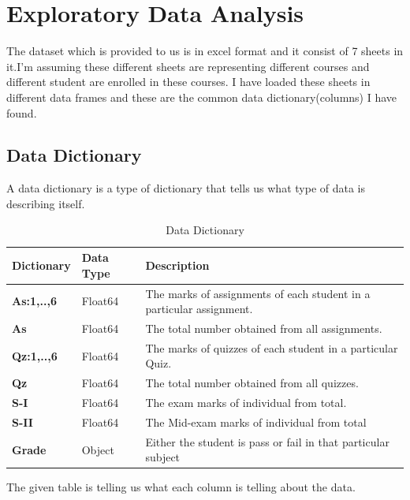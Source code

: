 \documentclass[12pt,a4paper]{article}
\begin{document}
	
 
 \clearpage
\tableofcontents
\clearpage
\section{Exploratory Data Analysis}
The dataset which  is provided to us is in excel format and it consist of 7 sheets in it.I’m assuming these different sheets are representing different courses and different student are enrolled in these courses. I have loaded these sheets in different data frames and these are the common data dictionary(columns) I have found.
\subsection{Data Dictionary}
A data dictionary is a type of dictionary that tells us what type of data is describing itself.
\begin{table}[h!]
\caption{Data Dictionary}
    \centering
    \begin{tabular}{|p{3cm}|p{3cm}|p{5cm}|}
    \hline
       \textbf{Dictionary}&Data Type&\textbf{Description} \\ %
       \hline
        \textbf{As:1,..,6}&Float64&The marks  of assignments of each student in a particular assignment. \\ %
        \hline
         \textbf{As}&Float64&The total number obtained from all assignments. \\ %
        \hline
        \textbf{Qz:1,..,6}&Float64&The marks of quizzes of each student in a particular  Quiz. \\ %
        \hline
         \textbf{Qz}&Float64&The total number obtained from all quizzes. \\ %
        \hline
         \textbf{S-I}&Float64&The exam marks of individual from total. \\ %
        \hline
        \textbf{S-II}&Float64&The Mid-exam marks of individual from total \\ %
        \hline
        \textbf{Grade}&Object&Either the student is pass or fail in that particular subject \\ %
        \hline      
    \end{tabular} 
    \end{table}
\newline The given table is telling us what each column is telling about the data.
\end{document}
